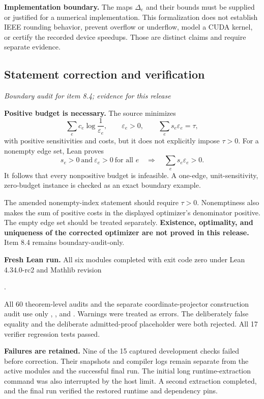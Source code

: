 \textbf{Implementation boundary.} The maps $\Delta_e$ and their bounds must be supplied or justified for a numerical implementation. This formalization does not establish IEEE rounding behavior, prevent overflow or underflow, model a CUDA kernel, or certify the recorded device speedups. Those are distinct claims and require separate evidence.



\subsection{Statement correction and verification}\label{supp1:subsection:005}\textit{Boundary audit for item 8.4; evidence for this release}\par
\textbf{Positive budget is necessary.} The source minimizes
\[
\sum_e c_e\log\frac1{\varepsilon_e},\qquad
\varepsilon_e>0,\qquad \sum_e s_e\varepsilon_e=\tau,
\]
with positive sensitivities and costs, but it does not explicitly impose $\tau>0$. For a nonempty edge set, Lean proves
\[
s_e>0\ \text{and}\ \varepsilon_e>0\ \text{for all }e
\quad\Longrightarrow\quad
\sum_e s_e\varepsilon_e>0.
\]
It follows that every nonpositive budget is infeasible. A one-edge, unit-sensitivity, zero-budget instance is checked as an exact boundary example.

The amended nonempty-index statement should require $\tau>0$. Nonemptiness also makes the sum of positive costs in the displayed optimizer's denominator positive. The empty edge set should be treated separately. \textbf{Existence, optimality, and uniqueness of the corrected optimizer are not proved in this release.} Item 8.4 remains boundary-audit-only.

\textbf{Fresh Lean run.} All six modules completed with exit code zero under Lean 4.34.0-rc2 and Mathlib revision
\begin{center}.
\end{center}
All 60 theorem-level audits and the separate coordinate-projector construction audit use only , , and . Warnings were treated as errors. The deliberately false equality and the deliberate admitted-proof placeholder were both rejected. All 17 verifier regression tests passed.

\textbf{Failures are retained.} Nine of the 15 captured development checks failed before correction. Their snapshots and compiler logs remain separate from the active modules and the successful final run. The initial long runtime-extraction command was also interrupted by the host limit. A second extraction completed, and the final run verified the restored runtime and dependency pins.

